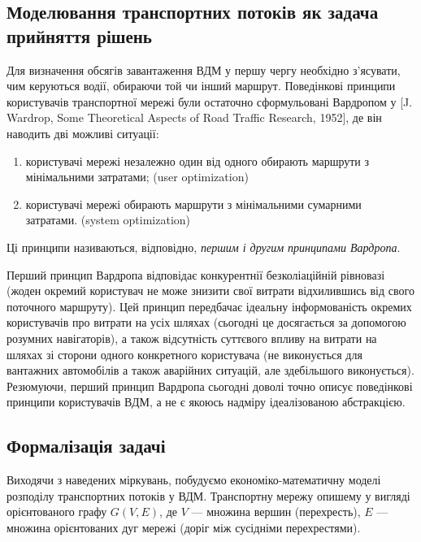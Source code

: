 \subsection{Моделювання транспортних потоків як задача прийняття рішень}

Для визначення обсягів завантаження ВДМ у першу чергу необхідно з'я\-су\-ва\-ти, чим керуються водії, обираючи той чи інший маршрут. Поведінкові принципи користувачів транспортної мережі були остаточно сформульовані Вардропом у [J. Wardrop, Some Theoretical Aspects of Road Traffic Research, 1952], де він наводить дві можливі ситуації:
\begin{enumerate}
    \item користувачі мережі незалежно один від одного обирають маршрути з мінімальними затратами; (user optimization)
    \item користувачі мережі обирають маршрути з мінімальними сумарними затратами. (system optimization)
\end{enumerate}

\begin{definition}
    Ці принципи називаються, відповідно, \emph{першим і другим принципами Вардропа}.
\end{definition}

Перший принцип Вардропа відповідає конкурентнії безколіаційній рівновазі (жоден окремий користувач не може знизити свої витрати відхилившись від свого поточного маршруту). Цей принцип передбачає ідеальну інформованість окремих користувачів про витрати на усіх шляхах (сьогодні це досягається за допомогою розумних навігаторів), а також відсутність суттєвого впливу на витрати на шляхах зі сторони одного конкретного користувача (не виконується для вантажних автомобілів а також аварійних ситуацій, але здебільшого виконується). Резюмуючи, перший принцип Вардропа сьогодні доволі точно описує поведінкові принципи користувачів ВДМ, а не є якоюсь надміру ідеалізованою абстракцією.

\subsection{Формалізація задачі}

Виходячи з наведених міркувань, побудуємо економіко-математичну моделі розподілу транспортних потоків у ВДМ. Транспортну мережу опишему у вигляді орієнтованого графу $G(V, E)$, де $V$ --- множина вершин (перехресть), $E$ --- множина орієнтованих дуг мережі (доріг між сусідніми перехрестями). \medskip

